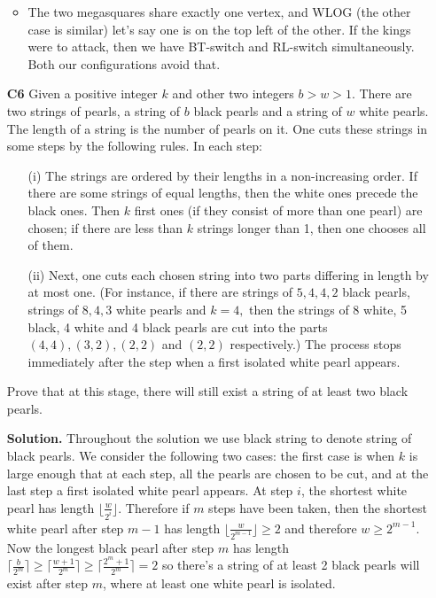 \documentclass[11pt]{article}
\newcommand{\<}{\langle}
\renewcommand{\>}{\rangle}
\begin{document}
\begin{enumerate}
\begin{itemize}
		\item The two megasquares share exactly one vertex, and WLOG (the other case is similar) let's say one is on the top left of the other. If the kings were to attack, then we have BT-switch and RL-switch simultaneously. Both our configurations avoid that. 
	\end{itemize}

	\item [\textbf{C6}] 
	Given a positive integer $k$ and other two integers $b > w > 1.$ There are two strings of pearls, a string of $b$ black pearls and a string of $w$ white pearls. The length of a string is the number of pearls on it. One cuts these strings in some steps by the following rules. In each step:
	\begin{enumerate}
		\item [(i)] The strings are ordered by their lengths in a non-increasing order. If there are some strings of equal lengths, then the white ones precede the black ones. Then $k$ first ones (if they consist of more than one pearl) are chosen; if there are less than $k$ strings longer than 1, then one chooses all of them.
		
		\item [(ii)] Next, one cuts each chosen string into two parts differing in length by at most one. (For instance, if there are strings of $5, 4, 4, 2$ black pearls, strings of $8, 4, 3$ white pearls and $k = 4,$ then the strings of 8 white, 5 black, 4 white and 4 black pearls are cut into the parts $(4,4), (3,2), (2,2)$ and $(2,2)$ respectively.) The process stops immediately after the step when a first isolated white pearl appears.
	\end{enumerate}
	
	Prove that at this stage, there will still exist a string of at least two black pearls.
	
	\textbf{Solution.} 
	Throughout the solution we use black string to denote string of black pearls. 
	We consider the following two cases: the first case is when $k$ is large enough that at each step, all the pearls are chosen to be cut, and at the last step a first isolated white pearl appears. At step $i$, the shortest white pearl has length $\lfloor \frac{w}{2^i}\rfloor$. Therefore if $m$ steps have been taken, then the shortest white pearl after step $m-1$ has length $\lfloor \frac{w}{2^{m-1}}\rfloor\ge 2$ and therefore $w\ge 2^{m-1}$. 
	Now the longest black pearl after step $m$ has length $\lceil \frac{b}{2^m}\rceil\ge \lceil \frac{w+1}{2^m}\rceil\ge \lceil \frac{2^m+1}{2^m}\rceil=2$ so there's a string of at least 2 black pearls will exist after step $m$, where at least one white pearl is isolated. 
	

\end{enumerate}
\end{document}
